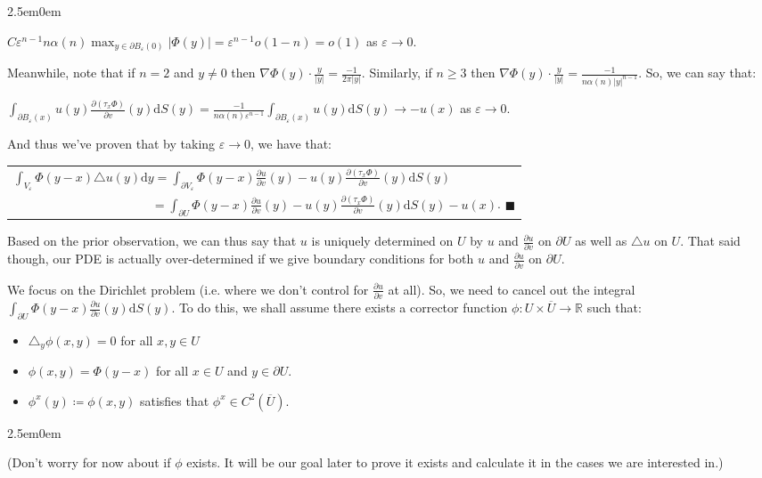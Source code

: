\documentclass{book}
\newcommand{\hTwo}{%
\color{Black}%
   \fontsize{13}{15}\selectfont%
}
\newcommand{\myComment}{%
   \color{RawerSienna}%
   \fontsize{12}{14}\selectfont%
}
\newenvironment{myIndent}{%
   \begin{adjustwidth}{2.5em}{0em}%
}{%
   \end{adjustwidth}%
}
\newcommand{\df}{\mathrm{d}}
\newcommand{\retTwo}{\hfill\bigbreak}
\begin{document}
\begin{myIndent}
	{\centering $C\varepsilon^{n-1} n\alpha(n) \max_{y \in \partial B_\varepsilon(0)}|\Phi(y)| = \varepsilon^{n-1}o(1 - n) = o(1)$ as $\varepsilon \to 0$. \retTwo\par}
	
	Meanwhile, note that if $n = 2$ and $y \neq 0$ then $\nabla \Phi(y) \cdot \frac{y}{|y|} = \frac{-1}{2\pi|y|}$. Similarly, if $n \geq 3$ then $\nabla \Phi(y) \cdot \frac{y}{|y|} = \frac{-1}{n\alpha(n)|y|^{n-1}}$. So, we can say that:

	{\center$\int_{\partial B_\varepsilon(x)}  u(y)\frac{\partial (\tau_x\Phi)}{\partial v}(y)\df S(y) = \frac{-1}{n\alpha(n)\varepsilon^{n-1}}\int_{\partial B_\varepsilon(x)}u(y)\df S(y) \to -u(x)$ as $\varepsilon \to 0$. \retTwo\par}

	And thus we've proven that by taking $\varepsilon \to 0$, we have that:

	{\centering\begin{tabular}{l}
		$\int_{V_\varepsilon} \Phi(y - x)\triangle u(y) \df y = \int_{\partial V_\varepsilon} \Phi(y - x) \frac{\partial u}{\partial v}(y) - u(y)\frac{\partial (\tau_x\Phi)}{\partial v}(y)\df S(y)$\\ [8pt]
		$\phantom{\int_U \Phi(y - x)\triangle u(y) \df y} = \int_{\partial U} \Phi(y - x) \frac{\partial u}{\partial v}(y) - u(y)\frac{\partial (\tau_x\Phi)}{\partial v}(y)\df S(y) - u(x)$. $\blacksquare$
	\end{tabular}\retTwo\par}
\end{myIndent}

\hTwo Based on the prior observation, we can thus say that $u$ is uniquely determined on $U$ by $u$ and $\frac{\partial u}{\partial v}$ on $\partial U$ as well as $\triangle u$ on $U$. That said though, our PDE is actually over-determined if we give boundary conditions for both $u$ and $\frac{\partial u}{\partial v}$ on $\partial U$.\retTwo

We focus on the Dirichlet problem (i.e. where we don't control for $\frac{\partial u}{\partial v}$ at all). So, we need to cancel out the integral $\int_{\partial U} \Phi(y - x)\frac{\partial u}{\partial v}(y)\df S(y)$. To do this, we shall assume there exists a corrector function $\phi: U \times \overline{U} \to \mathbb{R}$ such that:
\begin{itemize}
	\item $\triangle_y \phi(x, y) = 0$ for all $x, y \in U$
	\item $\phi(x, y) = \Phi(y - x)$ for all $x \in U$ and $y \in \partial U$.
	\item $\phi^x(y) \coloneqq \phi(x, y)$ satisfies that $\phi^x \in C^2(\overline{U})$.
\end{itemize}
\begin{myIndent}\myComment
	(Don't worry for now about if $\phi$ exists. It will be our goal later to prove it exists and calculate it in the cases we are interested in.)\newpage
\end{myIndent}
\end{document}
